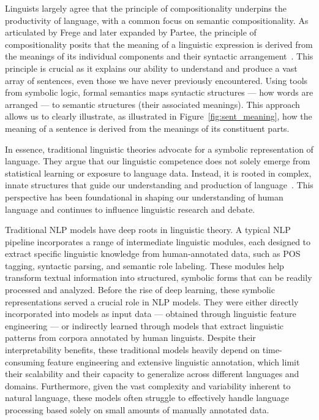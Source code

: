 Linguists largely agree that the principle of compositionality underpins the productivity of language, with a common focus on semantic compositionality. As articulated by Frege and later expanded by Partee, the principle of compositionality posits that the meaning of a linguistic expression is derived from the meanings of its individual components and their syntactic arrangement~\citep{frege_1892,partee1984compositionality}.  This principle is crucial as it explains our ability to understand and produce a vast array of sentences, even those we have never previously encountered. Using tools from symbolic logic, formal semantics maps syntactic structures --- how words are arranged --- to semantic structures (their associated meanings). This approach allows us to clearly illustrate, as illustrated in Figure~\ref{fig:sent_meaning}, how the meaning of a sentence is derived from the meanings of its constituent parts.

In essence, traditional linguistic theories advocate for a symbolic representation of language. They argue that our linguistic competence does not solely emerge from statistical learning or exposure to language data. Instead, it is rooted in complex, innate structures that guide our understanding and production of language~\citep{chomsky1965aspects, hauser2002faculty}. This perspective has been foundational in shaping our understanding of human language and continues to influence linguistic research and debate.

Traditional NLP models have deep roots in linguistic theory. A typical NLP pipeline incorporates a range of intermediate linguistic modules, each designed to extract specific linguistic knowledge from human-annotated data, such as POS tagging, syntactic parsing, and semantic role labeling. These modules help transform textual information into structured, symbolic forms that can be readily processed and analyzed. Before the rise of deep learning, these symbolic representations served a crucial role in NLP models. They were either directly incorporated into models as input data --- obtained through linguistic feature engineering --- or indirectly learned through models that extract linguistic patterns from corpora annotated by human linguists. Despite their interpretability benefits, these traditional models heavily depend on time-consuming feature engineering and extensive linguistic annotation, which limit their scalability and their capacity to generalize across different languages and domains. Furthermore, given the vast complexity and variability inherent to natural language, these models often struggle to effectively handle language processing based solely on small amounts of manually annotated data.
 

